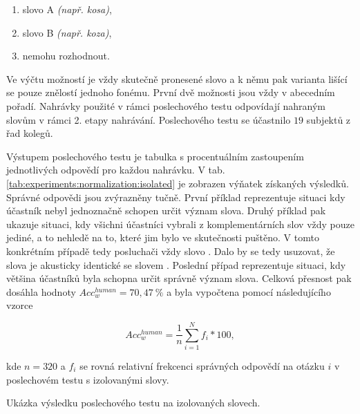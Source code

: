 \begin{enumerate}[label=\alph*)]
  \item slovo A \textit{(např. kosa)},
  \item slovo B \textit{(např. koza)},
  \item nemohu rozhodnout.
\end{enumerate}

\noindent Ve výčtu možností je vždy skutečně pronesené slovo a k němu pak varianta lišící se pouze znělostí jednoho fonému. První dvě možnosti jsou vždy v abecedním pořadí. Nahrávky použité v rámci poslechového testu odpovídají nahraným slovům v rámci 2. etapy nahrávání. Poslechového testu se účastnilo $19$ subjektů z řad kolegů.

Výstupem poslechového testu je tabulka s procentuálním zastoupením jednotlivých odpovědí pro každou nahrávku. V tab. \ref{tab:experiments:normalization:isolated} je zobrazen výňatek získaných výsledků. Správné odpovědi jsou zvýrazněny tučně. První příklad reprezentuje situaci kdy účastník nebyl jednoznačně schopen určit význam slova. Druhý příklad pak ukazuje situaci, kdy všichni účastníci vybrali z komplementárních slov vždy pouze jediné, a to nehledě na to, které jim bylo ve skutečnosti puštěno. V tomto konkrétním případě tedy posluchači vždy  slovo . Dalo by se tedy usuzovat, že slova  je akusticky identické se slovem . Poslední případ reprezentuje situaci, kdy většina účastníků byla schopna určit správně význam slova. Celková přesnost pak dosáhla hodnoty $Acc_w^{human} = 70,47\ \%$ a byla vypočtena pomocí následujícího vzorce

\begin{equation}
  Acc_w^{human} = \frac{1}{n} \sum_{i=1}^{N} f_i * 100,
  \label{eq:experiments:normalization:accuracy:human}
\end{equation}

\noindent kde $n=320$ a $f_i$ se rovná relativní frekcenci správných odpovědí na otázku $i$ v poslechovém testu s izolovanými slovy.

\begin{table}[htpb]
  \centering
  \def\arraystretch{1.5}
  \caption{Ukázka výsledku poslechového testu na izolovaných slovech.}
  \label{tab:experiments:normalization:isolated}
\end{table}

